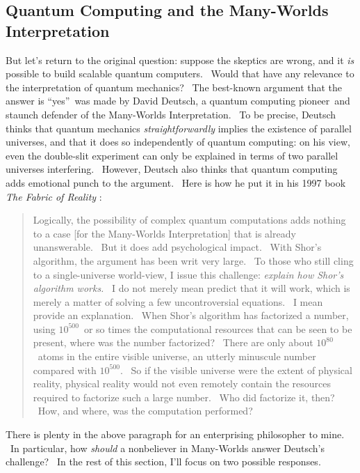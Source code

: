 \documentclass[12pt,onecolumn]{article}%
\begin{document}
\subsection{Quantum Computing and the Many-Worlds Interpretation\label{MWI}}

But let's return to the original question: suppose the skeptics are wrong, and
it \textit{is} possible to build scalable quantum computers. \ Would that have
any relevance to the interpretation of quantum mechanics? \ The best-known
argument that the answer is \textquotedblleft yes\textquotedblright\ was made
by David Deutsch, a quantum computing pioneer\ and staunch defender of the
Many-Worlds Interpretation. \ To be precise, Deutsch thinks that quantum
mechanics \textit{straightforwardly} implies the existence of parallel
universes, and that it does so independently of quantum computing: on his
view, even the double-slit experiment can only be explained in terms of two
parallel universes interfering. \ However, Deutsch also thinks that quantum
computing adds emotional punch to the argument. \ Here is how he put it in his
1997 book \textit{The Fabric of Reality} \cite[p. 217]{deutsch}:

\begin{quotation}
\noindent Logically, the possibility of complex quantum computations adds
nothing to a case [for the Many-Worlds Interpretation] that is already
unanswerable. \ But it does add psychological impact. \ With Shor's algorithm,
the argument has been writ very large. \ To those who still cling to a
single-universe world-view, I issue this challenge: \textit{explain how Shor's
algorithm works.} \ I do not merely mean predict that it will work, which is
merely a matter of solving a few uncontroversial equations. \ I mean provide
an explanation. \ When Shor's algorithm has factorized a number, using
$10^{500}$\ or so times the computational resources that can be seen to be
present, where was the number factorized? \ There are only about $10^{80}%
$\ atoms in the entire visible universe, an utterly minuscule number compared
with $10^{500}$. \ So if the visible universe were the extent of physical
reality, physical reality would not even remotely contain the resources
required to factorize such a large number. \ Who did factorize it, then?
\ How, and where, was the computation performed?
\end{quotation}

There is plenty in the above paragraph for an enterprising philosopher to
mine. \ In particular, how \textit{should} a nonbeliever in Many-Worlds answer
Deutsch's challenge? \ In the rest of this section, I'll focus on two possible responses.
\end{document}
